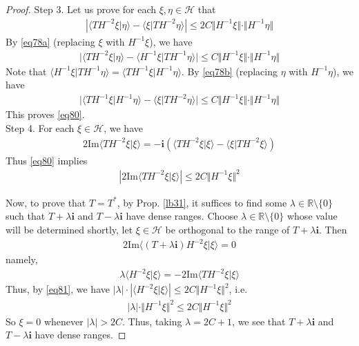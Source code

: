 \documentclass[12pt,b5paper,notitlepage]{article}
\theoremstyle{definition}
\theoremstyle{plain}
\newcommand{\mc}{\mathcal}
\newcommand{\bk}[1]{\langle {#1}\rangle}
\newcommand{\im}{\mathbf{i}}
\newcommand{\Rbb}{\mathbb R}
\newcommand{\Imag}{\mathrm{Im}}
\numberwithin{equation}{section}
\begin{document}
\begin{proof}
Step 3. Let us prove for each $\xi,\eta\in\mc H$ that
\begin{align}\label{eq80}
|\bk{TH^{-2}\xi|\eta}-\bk{\xi|TH^{-2}\eta}|\leq 2C\Vert H^{-1}\xi\Vert\cdot\Vert H^{-1}\eta\Vert
\end{align}
By \eqref{eq78a} (replacing $\xi$ with $H^{-1}\xi$), we have
\begin{gather*}
\big|\bk{TH^{-2}\xi|\eta}-\bk{H^{-1}\xi|TH^{-1}\eta} \big|\leq C\Vert H^{-1}\xi\Vert\cdot\Vert H^{-1}\eta\Vert
\end{gather*}
Note that $\bk{H^{-1}\xi|TH^{-1}\eta}=\bk{TH^{-1}\xi|H^{-1}\eta}$. By \eqref{eq78b} (replacing $\eta$ with $H^{-1}\eta$), we have
\begin{align*}
\big|\bk{TH^{-1}\xi|H^{-1}\eta}-\bk{\xi|TH^{-2}\eta} \big|\leq C\Vert H^{-1}\xi\Vert\cdot \Vert H^{-1}\eta\Vert
\end{align*}
This proves \eqref{eq80}.\\[-1ex]








Step 4. For each $\xi\in\mc H$, we have
\begin{align*}
2\Imag\bk{TH^{-2}\xi|\xi}=-\im(\bk{TH^{-2}\xi|\xi}-\bk{\xi|TH^{-2}\xi})
\end{align*}
Thus \eqref{eq80} implies
\begin{align}\label{eq81}
|2\Imag\bk{TH^{-2}\xi|\xi}|\leq 2C\Vert H^{-1}\xi\Vert^2
\end{align}

Now, to prove that $T=T^*$, by Prop. \ref{lb31}, it suffices to find some $\lambda\in\Rbb\setminus\{0\}$ such that $T+\lambda\im$ and $T-\lambda\im$ have dense ranges. Choose $\lambda\in\Rbb\setminus\{0\}$ whose value will be determined shortly, let $\xi\in\mc H$ be orthogonal to the range of $T+\lambda\im$. Then
\begin{align*}
2\Imag\bk{(T+\lambda\im)H^{-2}\xi|\xi}=0
\end{align*}
namely,
\begin{align*}
\lambda \bk{H^{-2}\xi|\xi}=-2\Imag\bk{TH^{-2}\xi|\xi}
\end{align*}
Thus, by \eqref{eq81}, we have $|\lambda|\cdot |\bk{H^{-2}\xi|\xi}|\leq 2C\Vert H^{-1}\xi\Vert^2$, i.e.
\begin{align*}
|\lambda|\cdot \Vert H^{-1}\xi\Vert^2\leq 2C\Vert H^{-1}\xi\Vert^2
\end{align*}
So $\xi=0$ whenever $|\lambda|>2C$. Thus, taking $\lambda=2C+1$, we see that $T+\lambda\im$ and $T-\lambda\im$ have dense ranges.
\end{proof}
\end{document}
